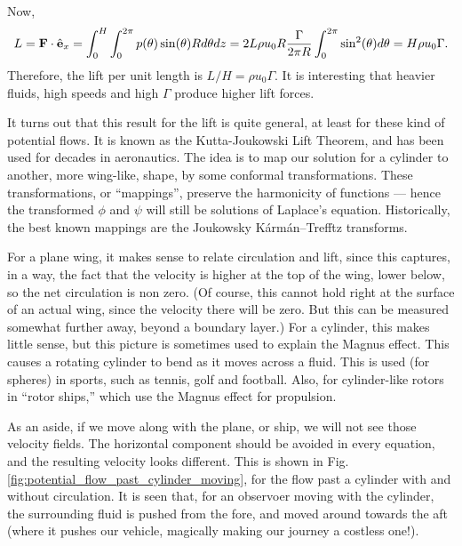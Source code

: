 Now,
\begin{equation}
  \label{eq:lift_potential_cyl}
  L= \mathbf{F} \cdot \hat{\mathbf{e}}_x = \int_0^H \int_0^{2\pi}
  p(\theta) \sin(\theta) R d\theta dz =
  2 L  \rho u_0  R  \frac{\Gamma}{2\pi R}   \int_0^{2\pi}  \sin^2(\theta) d\theta =
  H \rho u_0   \Gamma .
\end{equation}
Therefore, the lift per unit length is $L/H= \rho u_0 \Gamma$. It is
interesting that heavier fluids, high speeds and high $\Gamma$ produce
higher lift forces.

It turns out that this result for the lift is quite general, at least
for these kind of potential flows. It is known as the Kutta-Joukowski
Lift Theorem, and has been used for decades in aeronautics. The idea
is to map our solution for a cylinder to another, more wing-like,
shape, by some conformal transformations. These transformations, or
``mappings'', preserve the harmonicity of functions --- hence the
transformed $\phi$ and $\psi$ will still be solutions of Laplace's
equation. Historically, the best known mappings are the Joukowsky
K\'arm\'an–Trefftz transforms.

For a plane wing, it makes sense to relate circulation and lift, since
this captures, in a way, the fact that the velocity is higher at the
top of the wing, lower below, so the net circulation is non zero. (Of
course, this cannot hold right at the surface of an actual wing, since
the velocity there will be zero. But this can be measured somewhat
further away, beyond a boundary layer.) For a cylinder, this makes
little sense, but this picture is sometimes used to explain the Magnus
effect. This causes a rotating cylinder to bend as it moves across a
fluid. This is used (for spheres) in sports, such as tennis, golf and
football. Also, for cylinder-like rotors in ``rotor ships,'' which use
the Magnus effect for propulsion.

As an aside, if we move along with the plane, or ship, we will not see
those velocity fields. The horizontal component should be avoided in
every equation, and the resulting velocity looks different. This is
shown in Fig. \ref{fig:potential_flow_past_cylinder_moving}, for the
flow past a cylinder with and without circulation. It is seen that,
for an observoer moving with the cylinder, the surrounding fluid is
pushed from the fore, and moved around towards the aft (where it
pushes our vehicle, magically making our journey a costless one!).

